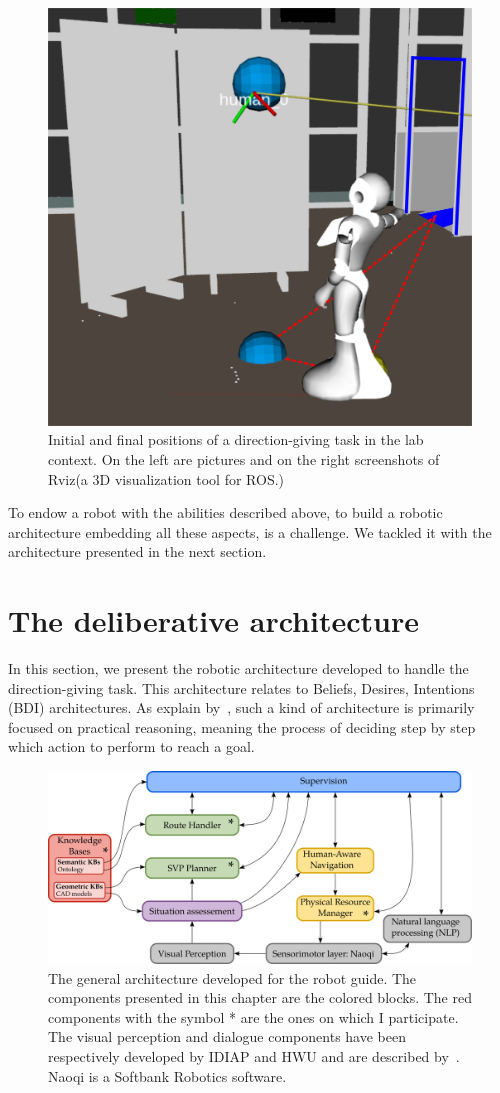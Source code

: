 \documentclass[a4paper,11pt,twoside]{StyleThese}
\begin{document}
\begin{figure}[!ht]
{\begin{minipage}{\linewidth}
			\includegraphics[width=.4\linewidth]{figures/chapter3/final_pose.jpg}
		\end{minipage}
	}\par  
	\caption[pos]{Initial and final positions of a direction-giving task in the lab context. On the left are pictures and on the right screenshots of Rviz\footnotemark (a 3D visualization tool for ROS.)}
	\label{fig:chap3_dir_giving_task}
\end{figure}


To endow a robot with the abilities described above, to build a robotic architecture embedding all these aspects, is a challenge. We tackled it with the architecture presented in the next section.

\section{The deliberative architecture}\label{sec:globalarchi}

In this section, we present the robotic architecture developed to handle the direction-giving task. This architecture relates to Beliefs, Desires, Intentions (BDI) architectures. As explain by~\cite{wooldridge_1999_intelligent}, such a kind of architecture is primarily focused on practical reasoning, meaning the process of deciding step by step which action to perform to reach a goal. 

\begin{figure}[ht!]
	\centering
	\includegraphics[width=\textwidth]{figures/chapter3/architecture.png}
	\caption{\label{fig:chap3_architecture} The general architecture developed for the robot guide. The components presented in this chapter are the colored blocks. The red components with the symbol * are the ones on which I participate. The visual perception and dialogue components have been respectively developed by IDIAP and HWU and are described by~\cite{foster_2019_mummer}. Naoqi is a Softbank Robotics software. }
\end{figure}
\end{document}
